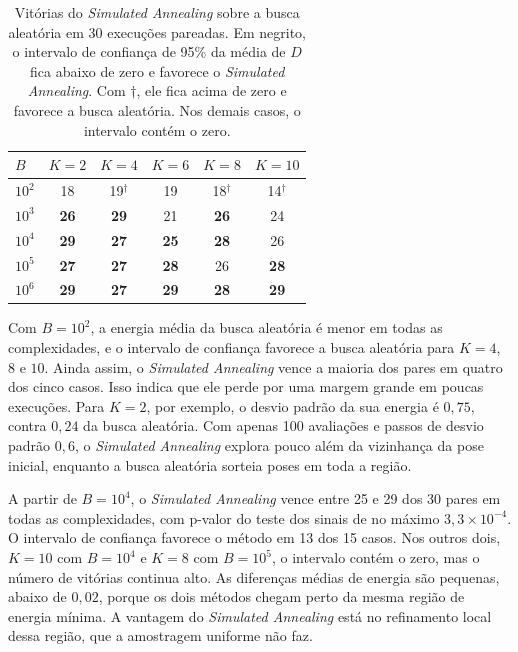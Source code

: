\documentclass[conference]{IEEEtran}
\theoremstyle{definition}
\theoremstyle{plain}
\begin{document}
\begin{table}[htbp]
\centering
\caption{Vitórias do \textit{Simulated Annealing} sobre a busca aleatória em 30 execuções pareadas. Em negrito, o intervalo de confiança de 95\% da média de $D$ fica abaixo de zero e favorece o \textit{Simulated Annealing}. Com $\dagger$, ele fica acima de zero e favorece a busca aleatória. Nos demais casos, o intervalo contém o zero.}
\label{tab:sa_resultados}
\footnotesize
\begin{tabular}{@{}lccccc@{}}
\toprule
$B$ & $K=2$ & $K=4$ & $K=6$ & $K=8$ & $K=10$ \\
\midrule
$10^2$ & 18 & 19$^\dagger$ & 19 & 18$^\dagger$ & 14$^\dagger$ \\
$10^3$ & \textbf{26} & \textbf{29} & 21 & \textbf{26} & 24 \\
$10^4$ & \textbf{29} & \textbf{27} & \textbf{25} & \textbf{28} & 26 \\
$10^5$ & \textbf{27} & \textbf{27} & \textbf{28} & 26 & \textbf{28} \\
$10^6$ & \textbf{29} & \textbf{27} & \textbf{29} & \textbf{28} & \textbf{29} \\
\bottomrule
\end{tabular}
\end{table}

Com $B = 10^2$, a energia média da busca aleatória é menor em todas as complexidades, e o intervalo de confiança favorece a busca aleatória para $K = 4$, $8$ e $10$. Ainda assim, o \textit{Simulated Annealing} vence a maioria dos pares em quatro dos cinco casos. Isso indica que ele perde por uma margem grande em poucas execuções. Para $K = 2$, por exemplo, o desvio padrão da sua energia é $0{,}75$, contra $0{,}24$ da busca aleatória. Com apenas 100 avaliações e passos de desvio padrão $0{,}6$, o \textit{Simulated Annealing} explora pouco além da vizinhança da pose inicial, enquanto a busca aleatória sorteia poses em toda a região.

A partir de $B = 10^4$, o \textit{Simulated Annealing} vence entre 25 e 29 dos 30 pares em todas as complexidades, com p-valor do teste dos sinais de no máximo $3{,}3 \times 10^{-4}$. O intervalo de confiança favorece o método em 13 dos 15 casos. Nos outros dois, $K = 10$ com $B = 10^4$ e $K = 8$ com $B = 10^5$, o intervalo contém o zero, mas o número de vitórias continua alto. As diferenças médias de energia são pequenas, abaixo de $0{,}02$, porque os dois métodos chegam perto da mesma região de energia mínima. A vantagem do \textit{Simulated Annealing} está no refinamento local dessa região, que a amostragem uniforme não faz.
\end{document}
